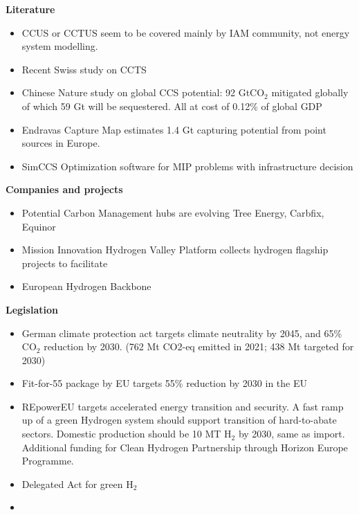\textbf{Literature}


\begin{itemize}
    \item CCUS or CCTUS seem to be covered mainly by IAM community, not energy system modelling. 
    \item \cite{CaptureMapGetSitespecific} Recent Swiss study on CCTS
    \item \cite{weiProposedGlobalLayout2021} Chinese Nature study on global CCS potential: 92 GtCO$_2$ mitigated globally of which 59 Gt will be sequestered. All at cost of 0.12\% of global GDP   
    \item \cite{ToolsGreenTransition} Endravas Capture Map estimates 1.4 Gt capturing potential from point sources in Europe.
    \item SimCCS Optimization software for MIP problems with infrastructure decision \cite{middletonSimCCSOpensourceTool2020}
\end{itemize}


\textbf{Companies and projects}
\begin{itemize}
    \item Potential Carbon Management hubs are evolving Tree Energy, Carbfix, Equinor    
    \item Mission Innovation Hydrogen Valley Platform \cite{H2ValleysMissionInnovation} collects hydrogen flagship projects to facilitate 
    \item European Hydrogen Backbone \cite{gasforclimateEuropeanHydrogenBackbone2022} 
\end{itemize}


\textbf{Legislation}
\begin{itemize}
    \item German climate protection act \cite{KlimaschutzgesetzKlimaneutralitaetBis} targets climate neutrality by 2045, and 65\% CO$_2$ reduction by 2030. (762 Mt CO2-eq emitted in 2021; 438 Mt targeted for 2030) 
    \item Fit-for-55 package by EU targets 55\% reduction by 2030 in the EU
    \item REpowerEU \cite{REPowerEU} targets accelerated energy transition and security. A fast ramp up of a green Hydrogen system should support transition of hard-to-abate sectors. Domestic production should be 10 MT H$_2$ by 2030, same as import. Additional funding for Clean Hydrogen Partnership through Horizon Europe Programme. 
    \item Delegated Act for green H$_2$
    \item 
\end{itemize}



